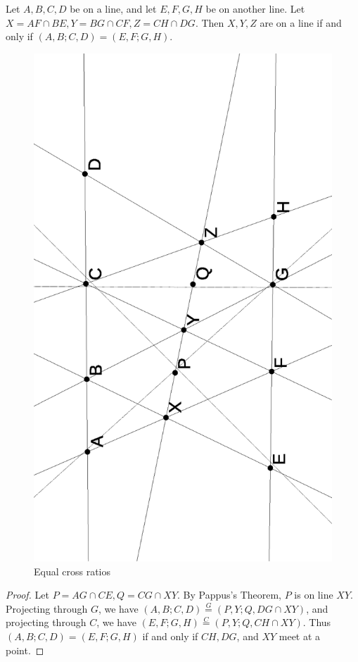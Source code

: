 \begin{thm}\label{cr-equal} Let $A,B,C,D$ be on a line, and let $E,F,G,H$ be on another line. Let $X = AF\cap BE, Y = BG\cap CF, Z = CH\cap DG$. Then $X,Y,Z$ are on a line if and only if $(A,B;C,D) = (E,F;G,H)$.
\end{thm}
\begin{figure}[!htb]
\centering
\includegraphics[scale=.5,angle=270]{equal.eps}
\caption{Equal cross ratios}
\end{figure}
\begin{proof} Let $P = AG\cap CE, Q = CG\cap XY$. By Pappus's Theorem, $P$ is on line $XY$. Projecting through $G$, we have $(A,B;C,D) \stackrel{G}{=} (P,Y;Q,DG\cap XY)$, and projecting through $C$, we have $(E,F;G,H) \stackrel{C}{=} (P,Y;Q,CH\cap XY)$. Thus $(A,B;C,D) = (E,F;G,H)$ if and only if $CH, DG$, and $XY$ meet at a point.
\end{proof}

